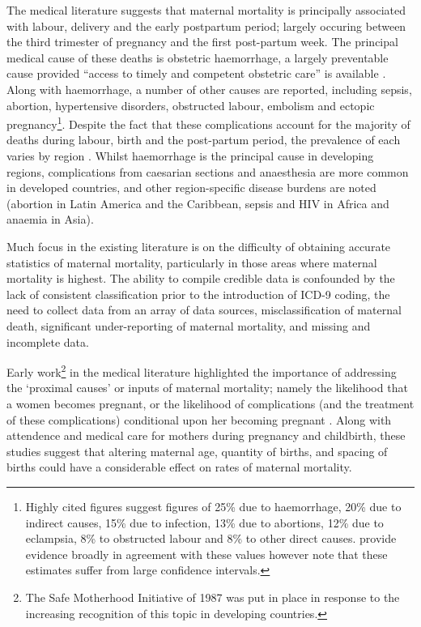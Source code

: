 \documentclass{article}
\begin{document}
\begin{spacing}{1.4}
The medical literature suggests that maternal mortality is principally 
associated with labour, delivery and the early postpartum period; largely 
occuring between the third trimester of pregnancy and the first post-partum 
week. The principal medical cause of these deaths is obstetric haemorrhage, a 
largely preventable cause provided ``access to timely and competent obstetric 
care'' is available \citep{RonsmansGraham2006}.  Along with haemorrhage, a number 
of other causes are reported, including sepsis, abortion, hypertensive disorders, 
obstructed labour, embolism and ectopic pregnancy\footnote{Highly cited figures 
\citep{WHOetal1991} suggest figures of 25\% due to haemorrhage, 20\% due to 
indirect causes, 15\% due to infection, 13\% due to abortions, 12\% due to 
eclampsia, 8\% to obstructed labour and 8\% to other direct causes. 
\citet{Khanetal2006} provide evidence broadly in agreement with these values 
however note that these estimates suffer from large confidence intervals.}.  
Despite the fact that these complications account for the majority of deaths 
during labour, birth and the post-partum period, the prevalence of each varies 
by region \citep{Khanetal2006}.  Whilst haemorrhage is the principal cause in 
developing regions, complications from caesarian sections and anaesthesia are more 
common in developed countries, and other region-specific disease burdens are noted 
(abortion in Latin America and the Caribbean, sepsis and HIV in Africa and anaemia 
in Asia).

Much focus in the existing literature is on the difficulty of obtaining accurate 
statistics of maternal mortality, particularly in those areas where maternal 
mortality is highest\citep{RonsmansGraham2006, MccarthyMaine1992, 
McAlisterBaskett2006}.  The ability to compile credible data is confounded by the 
lack of consistent classification prior to the introduction of ICD-9 coding, the 
need to collect data from an array of data sources, misclassification of maternal 
death, significant under-reporting of maternal mortality, and missing and 
incomplete data\citep{Yazbeck2007, Hoganetal2010}.

Early work\footnote{The Safe Motherhood Initiative of 1987 was put in place in 
response to the increasing recognition of this topic in developing countries.} 
in the medical literature highlighted the importance of addressing the `proximal 
causes' or inputs of maternal mortality; namely the likelihood that a women 
becomes pregnant, or the likelihood of complications (and the treatment of these 
complications) conditional upon her becoming pregnant \citep{MccarthyMaine1992, 
GoodburnCampbell2001, TrusselPebley1984}.  Along with attendence and medical 
care for mothers during pregnancy and childbirth, these studies suggest that 
altering maternal age, quantity of births, and spacing of births could have a 
considerable effect on rates of maternal mortality.  


\end{spacing}
\end{document}
